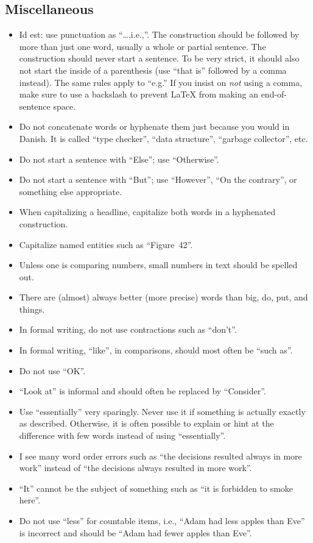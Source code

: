 \documentclass[a4paper,12pt]{report}
\begin{document}
\subsection*{Miscellaneous}
\begin{itemize}
\item
Id est: use punctuation as
``\ldots,\textvisiblespace{}i.e.,\textvisiblespace''.
The construction should be followed by more than just one word,
usually a whole or partial sentence.
The construction should never start a sentence.
To be very strict, it should also not start the inside
of a parenthesis (use ``that is'' followed by a comma instead).
The same rules apply to ``e.g.''
If you insist on \emph{not} using a comma, make sure to use a backslash
to prevent \LaTeX{} from making an end-of-sentence space.
\item
Do not concatenate words or hyphenate them just because you would in Danish.
It is called ``type checker'', ``data structure'', ``garbage collector'', etc.
\item
Do not start a sentence with ``Else''; use ``Otherwise''.
\item
Do not start a sentence with ``But''; use ``However'', ``On the contrary'',
or something else appropriate.
\item
When capitalizing a headline, capitalize both words in a hyphenated
construction.
\item
Capitalize named entities such as ``Figure~42''.
\item
Unless one is comparing numbers, small numbers in text should be
spelled out.
\item
  There are (almost) always better (more precise) words than
  big, do, put, and things.
\item
In formal writing, do not use contractions such as ``don't''.
\item
  In formal writing, ``like'', in comparisons, should most often be ``such as''.
\item
  Do not use ``OK''.
\item
``Look at'' is informal and should often be replaced by ``Consider''.
\item
  Use ``essentially'' very sparingly. Never use it if something is
  actually exactly as described. Otherwise, it is often possible
  to explain or hint at the difference with few words instead of
  using ``essentially''.
\item
  I see many word order errors such as
  ``the decisions resulted always in more work'' instead of
  ``the decisions always resulted in more work''.
\item
  ``It'' cannot be the subject of something such as ``it is forbidden to smoke
  here''. 
\item
  Do not use ``less'' for countable items, i.e., ``Adam had less apples than Eve'' is incorrect and should be ``Adam had fewer apples than Eve''.
\end{itemize}
\end{document}
